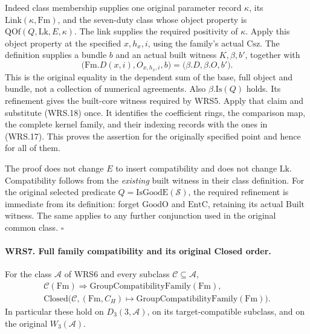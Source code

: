 Indeed class membership supplies one original parameter record
\(\kappa\), its \(\mathrm{Link}(\kappa,\mathrm{Fm})\), and
the seven-duty class whose object property is
\(\mathrm{QOf}(Q,\mathrm{Lk},E,\kappa)\).
The link supplies the required positivity of \(\kappa\).
Apply this object property at the specified \(x,h_x,i\), using
the family's actual \(\mathrm{Csz}\).  The definition supplies
a bundle \(b\) and an actual built witness
\(K,\beta,b'\), together with
\[
  \bigl(\mathrm{Fm}.D(x,i),O_{x,h_x,i},b\bigr)
       =\bigl(\beta.D,\beta.O,b'\bigr).              \tag{WRS.18}
\]
This is the original equality in the dependent sum of the base,
full object and bundle, not a collection of numerical agreements.
Also \(\beta.\mathrm{Is}(Q)\) holds.  Its refinement gives the
built-core witness required by WRS5.  Apply that claim and substitute
(WRS.18) once.  It identifies the coefficient rings, the comparison
map, the complete kernel family, and their indexing records with
the ones in (WRS.17).  This proves the assertion for the originally
specified point and hence for all of them.

The proof does not change \(E\) to insert compatibility and does
not change \(\mathrm{Lk}\).  Compatibility follows from the
\emph{existing} built witness in their class definition.  For the
original selected predicate \(Q=\mathrm{IsGoodE}(\mathcal S)\),
the required refinement is immediate from its definition: forget
\(\mathrm{GoodO}\) and \(\mathrm{EntC}\), retaining its actual
\(\mathrm{Built}\) witness.  The same applies to any further
conjunction used in the original common class.
\hfill\(\square\)

\paragraph{WRS7. Full family compatibility and its original Closed order.}
\label{claim:WRS7}
For the class \(\mathcal A\) of WRS6 and every subclass
\(\mathcal C\subseteq\mathcal A\),
\[
 \begin{gathered}
 \mathcal C(\mathrm{Fm})\Longrightarrow
                 \mathrm{GroupCompatibilityFamily}(\mathrm{Fm}),\\
 \mathrm{Closed}\bigl(\mathcal C,
           (\mathrm{Fm},C_H)\mapsto
                    \mathrm{GroupCompatibilityFamily}(\mathrm{Fm})\bigr).
 \end{gathered}                                                   \tag{WRS.19}
\]
In particular these hold on \(D_3(3,\mathcal A)\), on its
target-compatible subclass, and on the original \(W_3(\mathcal A)\).

